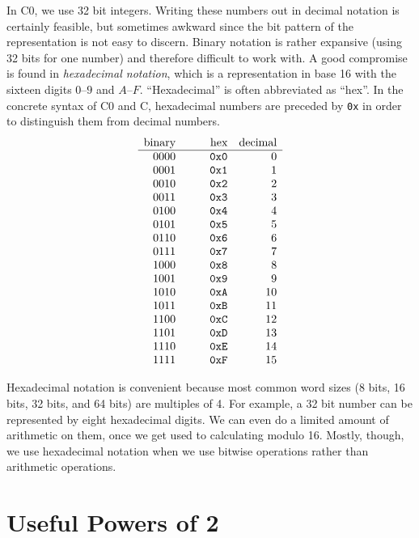 In C0, we use 32 bit integers.  Writing these numbers out in decimal
notation is certainly feasible, but sometimes awkward since the bit
pattern of the representation is not easy to discern.  Binary notation
is rather expansive (using 32 bits for one number) and therefore
difficult to work with.  A good compromise is found in
\emph{hexadecimal notation}, which is a representation in base 16 with
the sixteen digits $0$--$9$ and $A$--$F$.  ``Hexadecimal'' is often
abbreviated as ``hex''.  In the concrete syntax of C0 and C,
hexadecimal numbers are preceded by \lstinline'0x' in order to distinguish
them from decimal numbers.
$$
\begin{array}{r@{\hspace{3em}}rr}
\text{binary} & \text{hex} & \text{decimal}
\\\hline
   0000 & \mathtt{0x0} & 0
\\ 0001 & \mathtt{0x1} & 1
\\ 0010 & \mathtt{0x2} & 2
\\ 0011 & \mathtt{0x3} & 3
\\ 0100 & \mathtt{0x4} & 4
\\ 0101 & \mathtt{0x5} & 5
\\ 0110 & \mathtt{0x6} & 6
\\ 0111 & \mathtt{0x7} & 7
\\ 1000 & \mathtt{0x8} & 8
\\ 1001 & \mathtt{0x9} & 9
\\ 1010 & \mathtt{0xA} & 10
\\ 1011 & \mathtt{0xB} & 11
\\ 1100 & \mathtt{0xC} & 12
\\ 1101 & \mathtt{0xD} & 13
\\ 1110 & \mathtt{0xE} & 14
\\ 1111 & \mathtt{0xF} & 15
\end{array}
$$

Hexadecimal notation is convenient because most common word sizes (8
bits, 16 bits, 32 bits, and 64 bits) are multiples of 4.  For example,
a 32 bit number can be represented by eight hexadecimal digits.  We
can even do a limited amount of arithmetic on them, once we get used
to calculating modulo 16.  Mostly, though, we use hexadecimal notation
when we use bitwise operations rather than arithmetic operations.


\section{Useful Powers of 2}

